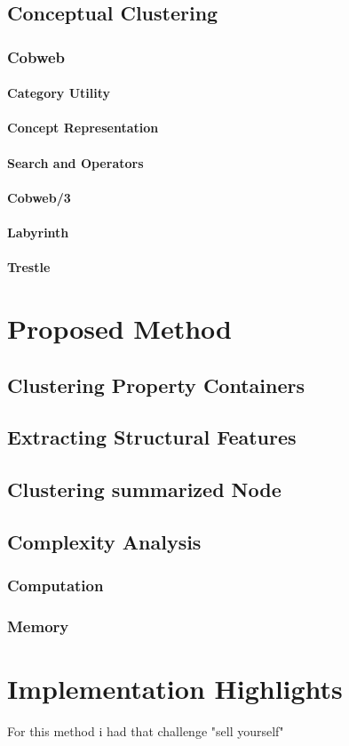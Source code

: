 \subsection{Conceptual Clustering}
\subsubsection{Cobweb}
\paragraph{Category Utility}
\paragraph{Concept Representation}
\paragraph{Search and Operators}

\paragraph{Cobweb/3}

\paragraph{Labyrinth}

\paragraph{Trestle}

\section{Proposed Method}
\subsection{Clustering Property Containers}
\subsection{Extracting Structural Features}
\subsection{Clustering summarized Node}

\subsection{Complexity Analysis}
\subsubsection{Computation}
\subsubsection{Memory}

\section{Implementation Highlights}
For this method i had that challenge "sell yourself"